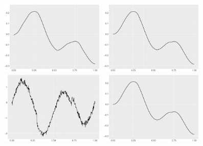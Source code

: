\documentclass{beamer}
\begin{document}
\begin{frame}
\begin{figure}
\centering
\includegraphics[width=5cm,height=3.5cm]{../Chapters/02TractorSplineTheory/plot/ggplot/ggHeaviSineGamma}
\includegraphics[width=5cm,height=3.5cm]{../Chapters/02TractorSplineTheory/plot/ggplot/ggHeaviSineTractorAPT}\\
\includegraphics[width=5cm,height=3.5cm]{../Chapters/02TractorSplineTheory/plot/ggplot/ggHeaviSineTractorVelocity}
\includegraphics[width=5cm,height=3.5cm]{../Chapters/02TractorSplineTheory/plot/ggplot/ggHeaviSineTractor}
\end{figure}
\end{frame}
\end{document}

